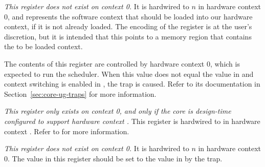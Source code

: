 
\emph{This register does not exist on context 0.} It is hardwired to
$n$ in hardware context 0, and represents the software context that
should be loaded into our hardware context, if it is not already loaded. The
encoding of the register is at the user's discretion, but it is intended that
this points to a memory region that contains the to be loaded context.

The contents of this register are controlled by hardware context 0, which is 
expected to run the scheduler. When this value does not equal the value in 
 and context switching is enabled in , the 
 trap is caused. Refer to its documentation in
Section~\ref{sec:core-ug-traps} for more information.

\implementation{}


\emph{This register only exists on context 0, and only if the core is
design-time configured to support hardware context \n{}.} This register is 
hardwired to  in hardware context \n{}. Refer to  for more
information.

\implementation{}


\emph{This register does not exist on context 0.} It is hardwired to
$n$ in hardware context 0. The value in this register should be set
to the value in  by the  trap.

